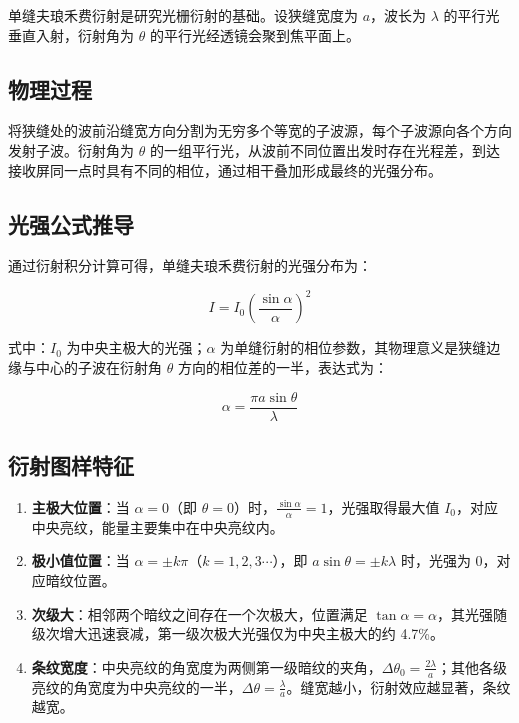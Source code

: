 \documentclass[12pt,a4paper]{ctexrep}
\begin{document}
单缝夫琅禾费衍射是研究光栅衍射的基础。设狭缝宽度为 $a$，波长为 $\lambda$ 的平行光垂直入射，衍射角为 $\theta$ 的平行光经透镜会聚到焦平面上。

\subsection{物理过程}

将狭缝处的波前沿缝宽方向分割为无穷多个等宽的子波源，每个子波源向各个方向发射子波。衍射角为 $\theta$ 的一组平行光，从波前不同位置出发时存在光程差，到达接收屏同一点时具有不同的相位，通过相干叠加形成最终的光强分布。

\subsection{光强公式推导}

通过衍射积分计算可得，单缝夫琅禾费衍射的光强分布为：

\begin{equation*}
I={I}_{0}{\left( \frac{\sin{\alpha}}{\alpha} \right)}^{2}
\end{equation*}

式中：${I}_{0}$ 为中央主极大的光强；$\alpha$ 为单缝衍射的相位参数，其物理意义是狭缝边缘与中心的子波在衍射角 $\theta$ 方向的相位差的一半，表达式为：

\begin{equation*}
\alpha=\frac{\pi a\sin \theta}{\lambda}
\end{equation*}

\subsection{衍射图样特征}

\begin{enumerate}[label=\arabic*., leftmargin=2em, itemsep=0pt]
\item \textbf{主极大位置}：当 $\alpha=0$（即 $\theta=0$）时，$\frac{\sin{\alpha}}{\alpha}=1$，光强取得最大值 ${I}_{0}$，对应中央亮纹，能量主要集中在中央亮纹内。
\item \textbf{极小值位置}：当 $\alpha=\pm k\pi$（$k=1,2,3\cdots$），即 $a\sin \theta=\pm k\lambda$ 时，光强为 0，对应暗纹位置。
\item \textbf{次级大}：相邻两个暗纹之间存在一个次极大，位置满足 $\tan \alpha=\alpha$，其光强随级次增大迅速衰减，第一级次极大光强仅为中央主极大的约 4.7\%。
\item \textbf{条纹宽度}：中央亮纹的角宽度为两侧第一级暗纹的夹角，$\Delta{\theta}_{0}=\frac{2\lambda}{a}$；其他各级亮纹的角宽度为中央亮纹的一半，$\Delta\theta=\frac{\lambda}{a}$。缝宽越小，衍射效应越显著，条纹越宽。
\end{enumerate}
\end{document}

